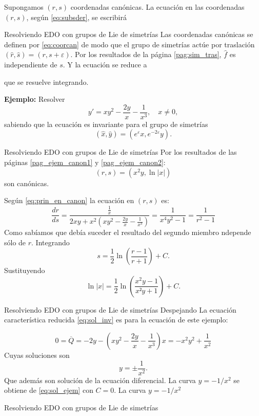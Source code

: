 \documentclass{article}
\renewcommand{\epsilon}{\varepsilon}
\newcounter{ejemplo_cont}
\begin{document}
Supongamos $(r,s)$ coordenadas canónicas. La ecuación en las coordenadas $(r,s)$, según \eqref{eq:subsder}, se escribirá
 



{Resolviendo EDO con grupos de Lie de simetrías}
Las coordenadas canónicas se definen por \eqref{eq:coorcan} de modo que el grupo de simetrías actúe por traslación $(\hat{r},\hat{s})=(r,s+\epsilon)$.
Por los resultados de la página  \ref{pag:sim_tras}, $\hat{f}$ es independiente de $s$. Y la ecuación se reduce a

que se resuelve integrando.


\textbf{Ejemplo:} Resolver
\[y'=xy^2-\frac{2y}{x}-\frac{1}{x^3},\quad x\neq 0,\]
sabiendo que la ecuación es invariante para el grupo de simetrías
\[(\hat{x},\hat{y})=(e^{\epsilon}x,e^{-2\epsilon}y).\]



{Resolviendo EDO con grupos de Lie de simetrías}
Por los resultados de las páginas \ref{pag_ejem_canon1} y \ref{pag_ejem_canon2}:
\[(r,s)=(x^2y,\ln|x|)\]
son canónicas.

 Según \eqref{eq:prin_en_canon} la ecuación en $(r,s)$ es:
\[\frac{dr}{ds}=\frac{\frac{1}{x}}{2xy+x^2\left(  xy^2-\frac{2y}{x}-\frac{1}{x^3}     \right)}=\frac{1}{x^4y^2-1}=\frac{1}{r^2-1}\]
Como sabíamos que debía suceder el resultado del segundo miembro ndepende sólo de $r$. Integrando
\[s=\frac12\ln\left( \frac{r-1}{r+1}  \right)+C.\]
Sustituyendo
\[\ln|x|=\frac12\ln\left( \frac{x^2y-1}{x²y+1}  \right)+C.\]






{Resolviendo EDO con grupos de Lie de simetrías}
Despejando
La ecuación característica reducida \eqref{eq:sol_inv} es para la ecuación de este ejemplo:

\[0=\overline{Q}=-2y- \left(xy^2-\frac{2y}{x}-\frac{1}{x^3}  \right)x=-x^2y^2+\frac{1}{x^2}\]
Cuyas soluciones son
\[y=\pm\frac{1}{x^2}.\]
Que además son solución de la ecuación diferencial. La curva $y=-1/x^2$ se obtiene de \eqref{eq:sol_ejem} con $C=0$. La  curva $y=-1/x^2$




{Resolviendo EDO con grupos de Lie de simetrías}
\end{document}
